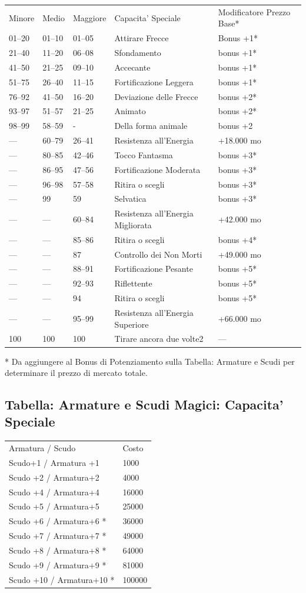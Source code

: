 \documentclass[a4paper,11pt,twoside,openany]{dndbook}
\begin{document}
{\begin{tabular}[c]{@{}lllll@{}}
\toprule 
Minore & Medio & Maggiore & Capacita' Speciale & Modificatore Prezzo Base{*}\tabularnewline
01--20 & 01--10 & 01--05 & Attirare Frecce & Bonus +1{*}\tabularnewline
21--40 & 11--20 & 06--08 & Sfondamento & bonus +1{*}\tabularnewline
41--50 & 21--25 & 09--10 & Accecante & bonus +1{*}\tabularnewline
51--75 & 26--40 & 11--15 & Fortificazione Leggera & bonus +1{*}\tabularnewline
76--92 & 41--50 & 16--20 & Deviazione delle Frecce & bonus +2{*}\tabularnewline
93--97 & 51--57 & 21--25 & Animato & bonus +2{*}\tabularnewline
98--99 & 58--59 & - & Della forma animale & bonus +2\tabularnewline
--- & 60--79 & 26--41 & Resistenza all'Energia & +18.000 mo\tabularnewline
--- & 80--85 & 42--46 & Tocco Fantasma & bonus +3{*}\tabularnewline
--- & 86--95 & 47--56 & Fortificazione Moderata & bonus +3{*}\tabularnewline
--- & 96--98 & 57--58 & Ritira o scegli & bonus +3{*}\tabularnewline
--- & 99 & 59 & Selvatica & bonus +3{*}\tabularnewline
--- & --- & 60--84 & Resistenza all'Energia Migliorata & +42.000 mo\tabularnewline
--- & --- & 85--86 & Ritira o scegli & bonus +4{*}\tabularnewline
--- & --- & 87 & Controllo dei Non Morti & +49.000 mo\tabularnewline
--- & --- & 88--91 & Fortificazione Pesante & bonus +5{*}\tabularnewline
--- & --- & 92--93 & Riflettente & bonus +5{*}\tabularnewline
--- & --- & 94 & Ritira o scegli & bonus +5{*}\tabularnewline
--- & --- & 95--99 & Resistenza all'Energia Superiore & +66.000 mo\tabularnewline
100 & 100 & 100 & Tirare ancora due volte2 & ---\tabularnewline
\bottomrule
\end{tabular}

{*} Da aggiungere al Bonus di Potenziamento sulla Tabella: Armature
e Scudi per determinare il prezzo di mercato totale.


\subsection{Tabella: Armature e Scudi Magici: Capacita' Speciale}

\label{tabella-armature-e-scudi-magici-capacita-speciale}

\begin{tabular}[c]{@{}ll@{}}
\toprule 
Armatura / Scudo & Costo\tabularnewline
Scudo+1 / Armatura +1 & 1000\tabularnewline
Scudo +2 / Armatura+2 & 4000\tabularnewline
Scudo +4 / Armatura+4 & 16000\tabularnewline
Scudo +5 / Armatura+5 & 25000\tabularnewline
Scudo +6 / Armatura+6 {*} & 36000\tabularnewline
Scudo +7 / Armatura+7 {*} & 49000\tabularnewline
Scudo +8 / Armatura+8 {*} & 64000\tabularnewline
Scudo +9 / Armatura+9 {*} & 81000\tabularnewline
Scudo +10 / Armatura+10 {*} & 100000\tabularnewline
\bottomrule
\end{tabular}

}
\end{document}
